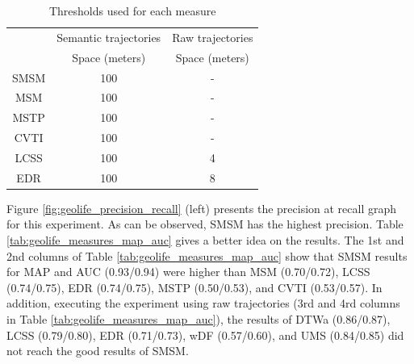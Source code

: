\documentclass[12pt]{article}
\begin{document}
\begin{table}[!h]
\scriptsize
  \centering
  \begin{tabular}{|c|c|c|}
  	\hline
  & \multicolumn{1}{c|}{Semantic trajectories} & \multicolumn{1}{c|}{Raw trajectories} \\
 	\cline{2-3}
  & Space (meters) & Space (meters) \\
  	\hline
 SMSM & 100 & - \\
 MSM & 100 & - \\
 MSTP & 100 & -  \\
 CVTI & 100 & - \\
 LCSS & 100 & 4 \\
 EDR & 100 & 8 \\
    \hline
  \end{tabular}
  \caption{Thresholds used for each measure}
  \label{tab:geolife_thresholds}
\end{table}

Figure \ref{fig:geolife_precision_recall} (left) presents the precision at recall graph for this experiment. As can be observed, SMSM has the highest precision. Table \ref{tab:geolife_measures_map_auc} gives a better idea on the results. The 1st and 2nd columns of Table \ref{tab:geolife_measures_map_auc} show that SMSM results for MAP and AUC (0.93/0.94) were higher than MSM (0.70/0.72), LCSS (0.74/0.75), EDR (0.74/0.75), MSTP (0.50/0.53), and CVTI (0.53/0.57). In addition, executing the experiment using raw trajectories (3rd and 4rd columns in Table \ref{tab:geolife_measures_map_auc}), the results of DTWa (0.86/0.87), LCSS (0.79/0.80), EDR (0.71/0.73), wDF (0.57/0.60), and UMS (0.84/0.85) did not reach the good results of SMSM.
\end{document}
